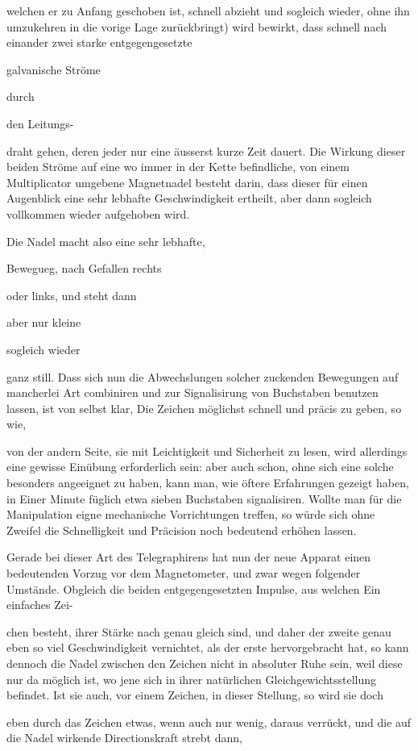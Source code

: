 \documentclass[12pt,a4paper]{article}
\begin{document}
welchen er zu Anfang geschoben ist, schnell abzieht und sogleich wieder, ohne ihn umzukehren in die vorige Lage zurückbringt) wird bewirkt, dass schnell nach einander zwei starke entgegengesetzte

galvanische Ströme

durch

den Leitungs-

draht gehen, deren jeder nur eine äusserst kurze Zeit dauert. Die Wirkung dieser beiden Ströme auf eine wo immer in der Kette befindliche, von einem Multiplicator umgebene Magnetnadel besteht darin, dass dieser für einen Augenblick eine sehr lebhafte Geschwindigkeit ertheilt, aber dann sogleich vollkommen wieder aufgehoben wird.

Die Nadel macht also eine sehr lebhafte,

Bewegueg, nach Gefallen rechts

oder links, und steht dann

aber nur kleine

sogleich wieder

ganz still. Dass sich nun die Abwechslungen solcher zuckenden Bewegungen auf mancherlei Art combiniren und zur Signalisirung von Buchstaben benutzen lassen, ist von selbst klar, Die Zeichen möglichst schnell und präcis zu geben, so wie,

von der andern Seite, sie mit Leichtigkeit und Sicherheit zu lesen, wird allerdings eine gewisse Einübung erforderlich sein: aber auch schon, ohne sich eine solche besonders angeeignet zu haben, kann man, wie öftere Erfahrungen gezeigt haben, in Einer Minute füglich etwa sieben Buchstaben signalisiren. Wollte man für die Manipulation eigne mechanische Vorrichtungen treffen, so würde sich ohne Zweifel die Schnelligkeit und Präcision noch bedeutend erhöhen lassen.

Gerade bei dieser Art des Telegraphirens hat nun der neue Apparat einen bedeutenden Vorzug vor dem Magnetometer, und zwar wegen folgender Umstände. Obgleich die beiden entgegengesetzten Impulse, aus welchen Ein einfaches Zei-

chen besteht, ihrer Stärke nach genau gleich sind, und daher der zweite genau eben so viel Geschwindigkeit vernichtet, als der erste hervorgebracht hat, so kann dennoch die Nadel zwischen den Zeichen nicht in absoluter Ruhe sein, weil diese nur da möglich ist, wo jene sich in ihrer natürlichen Gleichgewichtsstellung befindet. Ist sie auch, vor einem Zeichen, in dieser Stellung, so wird sie doch

eben durch das Zeichen etwas, wenn auch nur wenig, daraus verrückt, und die auf die Nadel wirkende Directionskraft strebt dann,
\end{document}
